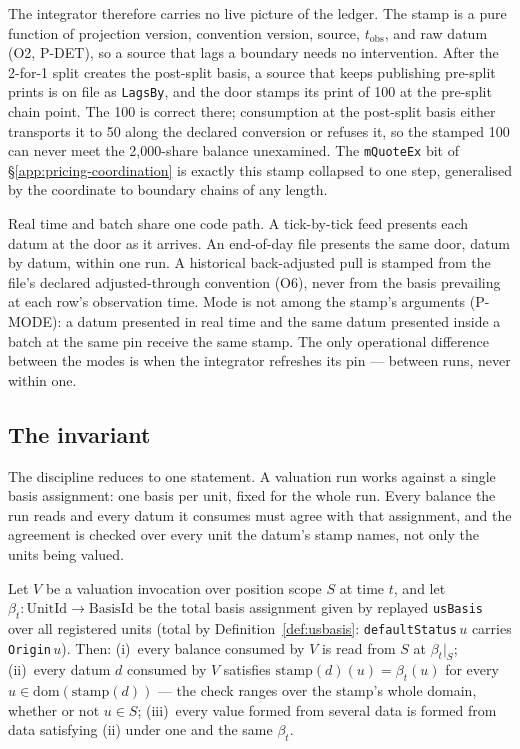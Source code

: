 The integrator therefore carries no live picture of the ledger. The stamp is a
pure function of projection version, convention version, source,
$t_{\mathrm{obs}}$, and raw datum (O2, P-DET), so a source that lags a boundary
needs no intervention. After the 2-for-1 split creates the post-split basis, a
source that keeps publishing pre-split prints is on file as \texttt{LagsBy},
and the door stamps its print of 100 at the pre-split chain point. The 100 is
correct there; consumption at the post-split basis either transports it to 50
along the declared conversion or refuses it, so the stamped 100 can never meet
the 2,000-share balance unexamined. The \texttt{mQuoteEx} bit of
\S\ref{app:pricing-coordination} is exactly this stamp collapsed to one step,
generalised by the coordinate to boundary chains of any length.

Real time and batch share one code path. A tick-by-tick feed presents each
datum at the door as it arrives. An end-of-day file presents the same door,
datum by datum, within one run. A historical back-adjusted pull is stamped from
the file's declared adjusted-through convention (O6), never from the basis
prevailing at each row's observation time. Mode is not among the stamp's
arguments (P-MODE): a datum presented in real time and the same datum presented
inside a batch at the same pin receive the same stamp. The only operational
difference between the modes is when the integrator refreshes its pin ---
between runs, never within one.

\subsection{The invariant}
\label{sec:basis-invariant}

The discipline reduces to one statement. A valuation run works against a single
basis assignment: one basis per unit, fixed for the whole run. Every balance
the run reads and every datum it consumes must agree with that assignment, and
the agreement is checked over every unit the datum's stamp names, not only the
units being valued.

\begin{invariant}
\label{inv:basis}
Let $V$ be a valuation invocation over position scope $S$ at time $t$, and let
$\beta_t:\mathrm{UnitId}\to\mathrm{BasisId}$ be the total basis assignment given by
replayed \texttt{usBasis} over all registered units (total by
Definition~\ref{def:usbasis}: \texttt{defaultStatus}\,$u$ carries \texttt{Origin}\,$u$). Then:
(i)~every balance consumed by $V$ is read from $S$ at $\beta_t|_S$;
(ii)~every datum $d$ consumed by $V$ satisfies
$\mathrm{stamp}(d)(u)=\beta_t(u)$ for every $u\in\mathrm{dom}(\mathrm{stamp}(d))$ ---
the check ranges over the stamp's whole domain, whether or not $u\in S$;
(iii)~every value formed from several data is formed from data satisfying (ii) under one
and the same $\beta_t$.
\end{invariant}

